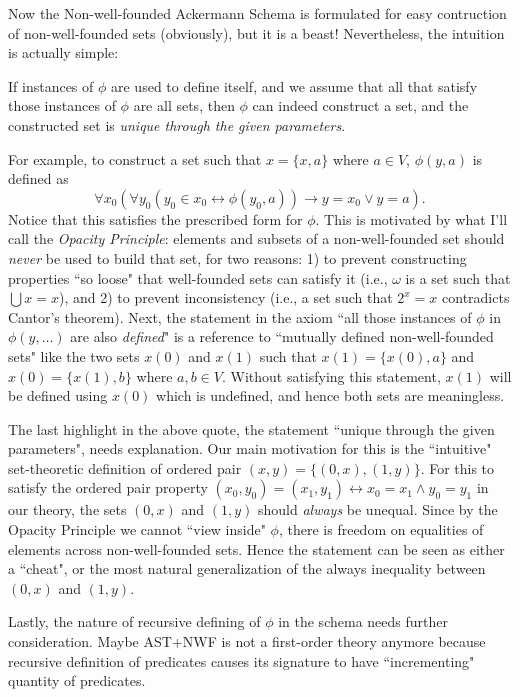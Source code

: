 \documentclass{article}
\begin{document}
Now the Non-well-founded Ackermann Schema is formulated for easy contruction of non-well-founded sets (obviously), but it is a beast! Nevertheless, the intuition is actually simple:

\begin{displayquote}
If instances of $\phi$ are used to define itself, and we assume that all that satisfy those instances of $\phi$ are all sets, then $\phi$ can indeed construct a set, and the constructed set is \textit{unique through the given parameters}.
\end{displayquote}

For example, to construct a set such that $x=\{x, a\}$ where $a \in V$, $\phi(y, a)$ is defined as $$\forall x_0 (\forall y_0 (y_0 \in x_0 \leftrightarrow \phi(y_0, a)) \rightarrow y = x_0 \vee y = a).$$ Notice that this satisfies the prescribed form for $\phi$. This is motivated by what I'll call the \textit{Opacity Principle}: elements and subsets of a non-well-founded set should \textit{never} be used to build that set, for two reasons: 1) to prevent constructing properties ``so loose" that well-founded sets can satisfy it (i.e., $\omega$ is a set such that $\bigcup x = x$), and 2) to prevent inconsistency (i.e., a set such that $2^x = x$ contradicts Cantor's theorem). Next, the statement in the axiom ``all those instances of $\phi$ in $\phi(y, \ldots)$ are also \textit{defined}" is a reference to ``mutually defined non-well-founded sets" like the two sets $x(0)$ and $x(1)$ such that $x(1) = \{x(0), a\}$ and $x(0) = \{x(1), b\}$ where $a, b \in V$. Without satisfying this statement, $x(1)$ will be defined using $x(0)$ which is undefined, and hence both sets are meaningless.

The last highlight in the above quote, the statement ``unique through the given parameters", needs explanation. Our main motivation for this is the ``intuitive" set-theoretic definition of ordered pair $(x,y) = \{(0,x), (1, y)\}$. For this to satisfy the ordered pair property $(x_0,y_0) = (x_1, y_1) \leftrightarrow x_0 = x_1 \wedge y_0 = y_1$ in our theory, the sets $(0,x)$ and $(1,y)$ should \textit{always} be unequal. Since by the Opacity Principle we cannot ``view inside" $\phi$, there is freedom on equalities of elements across non-well-founded sets. Hence the statement can be seen as either a ``cheat", or the most natural generalization of the always inequality between $(0,x)$ and $(1,y)$.

Lastly, the nature of recursive defining of $\phi$ in the schema needs further consideration. Maybe \textsf{AST+NWF} is not a first-order theory anymore because recursive definition of predicates causes its signature to have ``incrementing" quantity of predicates.


\end{document}
